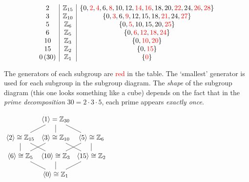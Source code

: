 \begin{example}{}{}
\[\begin{array}[t]{c|c|c}
			2 & \mathbb{Z}_{15} & \{0,\textcolor{red}{2},\textcolor{red}{4},6,\textcolor{red}{8},10,12,\textcolor{red}{14},\textcolor{red}{16},18,20,\textcolor{red}{22},24,\textcolor{red}{26},\textcolor{red}{28}\}\\
			3 & \mathbb{Z}_{10} & \{0,\textcolor{red}{3},6,\textcolor{red}{9},12,15,18,\textcolor{red}{21},24,\textcolor{red}{27}\}\\
			5 & \mathbb{Z}_6 & \{0,\textcolor{red}{5},10,15,20,\textcolor{red}{25}\}\\
			6 & \mathbb{Z}_5 & \{0,\textcolor{red}{6},\textcolor{red}{12},\textcolor{red}{18},\textcolor{red}{24}\}\\
			10 & \mathbb{Z}_3 & \{0,\textcolor{red}{10},\textcolor{red}{20}\}\\
			15 & \mathbb{Z}_2 & \{0,\textcolor{red}{15}\}\\
			0\,(30) & \mathbb{Z}_1 & \{\textcolor{red}{0}\}
   \end{array}
  \]
    
	\begin{minipage}[t]{0.62\linewidth}\vspace{0pt}
		The generators of each subgroup are \textcolor{red}{red} in the table. The `smallest' generator is used for each subgroup in the subgroup diagram.\smallbreak
		The \emph{shape} of the subgroup diagram (this one looks something like a cube) depends on the fact that in the \emph{prime decomposition} $30=2\cdot 3\cdot 5$, each prime appears \emph{exactly once}.
	\end{minipage}
	\hfill
	\begin{minipage}[t]{0.36\linewidth}\vspace{-5pt}
		\flushright%
		$\xymatrix @C4pt @R11pt{%
		 	& \ip{1}=\Z_{30} \ar@{-}[dl] \ar@{-}[d] \ar@{-}[dr] & \\
			\ip{2}\cong \Z_{15} \ar@{-}[d] \ar@{-}[dr] & \ip{3}\cong\Z_{10} \ar@{-}[dl] \ar@{-}[dr] & \ip{5}\cong\Z_6 \ar@{-}[d] \ar@{-}[dl] \\
			\ip{6}\cong\Z_5 \ar@{-}[dr] & \ip{10}\cong \Z_{3} \ar@{-}[d] & \ip{15}\cong\Z_2 \ar@{-}[dl] \\
 & \ip{0}\cong\Z_1 &}$
	\end{minipage}
 
\end{example}

\goodbreak

